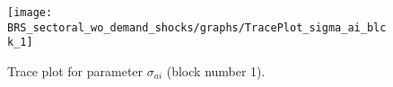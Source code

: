 \begin{figure}[H]
\centering
  \texttt{[image: BRS\_sectoral\_wo\_demand\_shocks/graphs/TracePlot\_sigma\_ai\_blck\_1]}\\
    \caption{Trace plot for parameter ${\sigma_{ai}}$ (block number 1).}
\end{figure}
